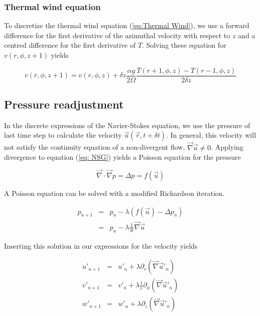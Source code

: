 \documentclass[12pt, a4paper]{article} %
\begin{document}
		\subsubsection{Thermal wind equation}
			To discretize the thermal wind equation (\ref{eq:Thermal Wind}), we use a forward difference for the first derivative of the azimuthal velocity with respect to $z$ and a centred difference for the first derivative of $T$. Solving these equation for $v(r,\phi, z+1)$ yields
			
			\begin{equation}
				v(r,\phi, z+1) = v(r,\phi,z) + \delta z \frac{\alpha g}{2\Omega} \frac{T(r+1,\phi,z) - T(r-1,\phi, z)}{2 \delta z}
				\label{eq:Discrete Thermal v}
			\end{equation}
		
			
	\subsection{Pressure readjustment} %
		In the discrete expressions of the Navier-Stokes equation, we use the pressure of last time step to calculate the velocity $\vec{u}(\vec{r},t+\delta t)$. In general, this velocity will not satisfy the continuity equation of a non-divergent flow, $\vec{\nabla} \vec{u} \neq 0$. Applying divergence to equation (\ref{eq: NSG}) yields a Poisson equation for the pressure
		
		\begin{equation}
			\vec{\nabla} \cdot \vec{\nabla} p = \Delta p = f(\vec{u})
			\label{eq:Poisson Pressure}
		\end{equation}
		
		A Poisson equation can be solved with a modified Richardson iteration. %
		
		\begin{eqnarray}
			p_{n+1} &=& p_n - \lambda \left(f(\vec{u}) - \Delta p_n\right)
			\nonumber \\
			&=& p_n - \lambda \frac{1}{\delta t} \vec{\nabla}\vec{u}
			\label{eq:Drucknachregelung p}
		\end{eqnarray}
		
		Inserting this solution in our expressions for the velocity yields
		
		\begin{eqnarray}
			u'_{n+1} &=& u'_n + \lambda \partial_r (\vec{\nabla}\vec{u}'_n) \\
			v'_{n+1} &=& v'_n + \lambda \frac{1}{r} \partial_\phi (\vec{\nabla}\vec{u}'_n) \\
			w'_{n+1} &=& w'_n + \lambda \partial_z (\vec{\nabla}\vec{u}'_n)
			\label{eq:Drucknachregelung uvw}
		\end{eqnarray}
		
\end{document}
